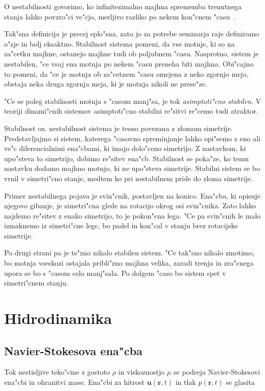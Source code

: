 \documentclass[a4paper,10pt]{article}
\renewcommand{\vec}{\mathbf}
\newcommand{\rt}{(\vec r, t)}
\begin{document}
O nestabilnosti govorimo, ko infinitezimalno majhna sprememba trenutnega stanja lahko povzro"ci ve"cjo, merljivo razliko po nekem kon"cnem "casu~\cite{drazin}. 

Tak"sna definicija je precej splo"sna, zato jo za potrebe seminarja raje definiramo o"zje in bolj eksaktno. Stabilnost sistema pomeni, da vse motnje, ki so na za"cetku majhne, ostanejo majhne tudi ob poljubnem "casu. Nasprotno, sistem je nestabilen, "ce vsaj ena motnja po nekem "casu preneha biti majhna. Obi"cajno to pomeni, da "ce je motnja ob za"cetnem "casu omejena z neko zgornjo mejo, obstaja neka druga zgornja meja, ki je motnja nikoli ne prese"ze. 

"Ce se poleg stabilnosti motnja s "casom manj"sa, je tok \emph{asimptoti"cno stabilen}. V teoriji dinami"cnih sistemov asimptoti"cno stabilni re"sitvi re"cemo tudi atraktor. 

Stabilnost oz. nestabilnost sistema je tesno povezana z zlomom simetrije. Predstavljajmo si sistem, katerega "casovno spreminjanje lahko opi"semo z eno ali ve"c diferencialnimi ena"cbami, ki imajo dolo"ceno simetrijo. Z nastavkom, ki upo"steva to simetrijo, dobimo re"sitev ena"cb. Stabilnost se poka"ze, ko temu nastavku dodamo majhno motnjo, ki ne upo"steva simetrije. Stabilni sistem se bo vrnil v simetri"cno stanje, medtem ko pri nestabilnem pride do zloma simetrije. 

Primer nestabilnega pojava je svin"cnik, postavljen na konico. Ena"cba, ki opisuje njegovo gibanje, je simetri"cna glede na rotacijo okrog osi svin"cnika. Zato lahko najdemo re"sitev z enako simetrijo, to je pokon"cna lega. "Ce pa svin"cnih le malo izmaknemo iz simetri"cne lege, bo padel in kon"cal v stanju brez rotacijske simetrije. 

Po drugi strani pa je te"zno nihalo stabilen sistem. "Ce tak"sno nihalo zmotimo, bo motnja vseskozi ostajala pribli"zno majhna velika, zaradi trenja in zra"cnega upora se bo s "casom celo manj"sala. Po dolgem "caso bo sistem spet v simetri"cnem stanju. 


\section{Hidrodinamika}

\subsection{Navier-Stokesova ena"cba}

Tok nestisljive teko"cine z gostoto $\rho$ in viskoznostjo $\mu$ se podreja Navier-Stokesovi ena"cbi in ohranitvi mase. Ena"cbi za hitrost $\vec u\rt$ in tlak $p\rt$ se glasita
\end{document}
